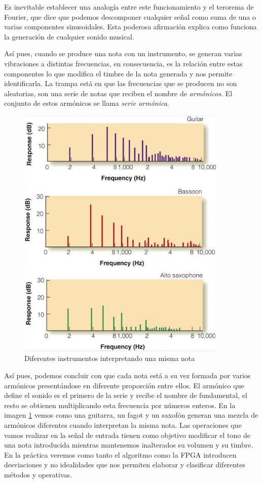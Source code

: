 Es inevitable establecer una analogía entre este funcionamiento y el terorema de Fourier, que dice que podemos descomponer cualquier señal como suma de una o varias componentes sinusoidales. Esta poderosa afirmación explica como funciona la generación de cualquier sonido musical.

Así pues, cuando se produce una nota con un instrumento, se generan varias vibraciones a distintas frecuencias, en consecuencia, es la relación entre estas componentes lo que modifica el timbre de la nota generada y nos permite identificarla. La trampa está en que las frecuencias que se producen no son aleatorias, son una serie de notas que reciben el nombre de \emph{armónicos}. El conjunto de estos armónicos se llama \emph{serie armónica}.

\begin{figure}[!bt]
\begin{center}
\includegraphics[width=10cm]{img/armonicos.jpg}
\caption{\label{fig:armonicos}Diferentes instrumentos interpretando una misma nota}
\end{center}
\end{figure}

Así pues, podemos concluir con que cada nota está a su vez formada por varios armónicos presentándose en diferente proporción entre ellos. El armónico que define el sonido es el primero de la serie y recibe el nombre de fundamental, el resto se obtienen multiplicando esta frecuencia por números enteros. En la imagen \ref{fig:armonicos} vemos como una guitarra, un fagot y un saxofón generan una mezcla de armónicos diferentes cuando interpretan la misma nota. Las operaciones que vamos realizar en la señal de entrada tienen como objetivo modificar el tono de una nota introducida mientras mantenemos inalterados su volumen y su timbre. En la práctica veremos como tanto el algoritmo como la FPGA introducen desviaciones y no idealidades que nos permiten elaborar y clasificar diferentes métodos y operativas.

